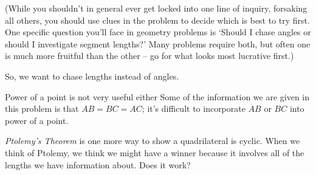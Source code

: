 (While you shouldn't in general ever get locked into one line of inquiry, forsaking all others, you should use clues in the problem to decide which is best to try first. One specific question you'll face in geometry problems is `Should I chase angles or should I investigate segment lengths?' Many problems require both, but often one is much more fruitful than the other -- go for what looks most lucrative first.)

So, we want to chase lengths instead of angles.

Power of a point is not very useful either Some of the information we are given in this problem is that $AB = BC = AC$; it's difficult to incorporate $AB$ or $BC$ into power of a point.





\vspace{10pt}
\emph{Ptolemy's Theorem} is one more way to show a quadrilateral is cyclic. When we think of Ptolemy, we think we might have a winner because it involves all of the lengths we have information about. Does it work?




